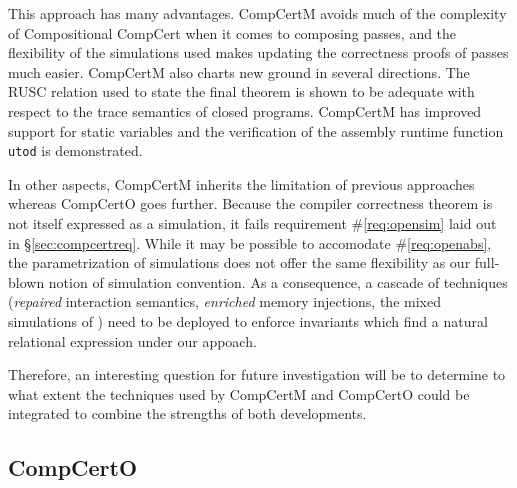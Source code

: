 \documentclass[draft,11pt]{report}
\begin{document}
This approach has many advantages.
CompCertM avoids much of the complexity
of Compositional CompCert
when it comes to composing passes,
and the flexibility of the simulations used
makes updating the correctness proofs of passes much easier.
CompCertM also charts new ground in several directions.
The RUSC relation used to state the final theorem
is shown to be adequate with respect to the trace semantics
of closed programs.
CompCertM has improved support for static variables
and the verification of
the assembly runtime function \texttt{utod} is demonstrated.

In other aspects,
CompCertM inherits the limitation of previous approaches
whereas CompCertO goes further.
Because the compiler correctness theorem
is not itself expressed as a simulation,
it fails requirement \#\ref{req:opensim}
laid out in \S\ref{sec:compcertreq}.
While it may be possible to accomodate \#\ref{req:openabs},
the parametrization of simulations
does not offer the same flexibility as
our full-blown notion of simulation convention.
As a consequence, a cascade of techniques
(\emph{repaired} interaction semantics,
\emph{enriched} memory injections,
the mixed simulations of \citep{pilsner})
need to be deployed to enforce invariants
which find a natural relational expression
under our appoach.

Therefore,
an interesting question for future investigation
will be to determine to what extent
the techniques used by CompCertM and CompCertO
could be integrated to combine
the strengths of both developments.


\subsection{CompCertO}
\end{document}
